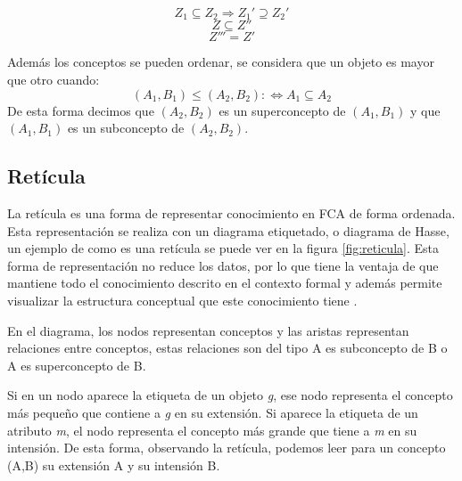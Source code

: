 \begin{equation}
Z_{1} \subseteq Z_{2} \Longrightarrow Z_{1}' \supseteq Z_{2}'
\end{equation}
\begin{equation}
Z \subseteq Z''
\end{equation}
\begin{equation}
Z''' = Z'
\end{equation}

Además los conceptos se pueden ordenar, se considera que un objeto es mayor que otro cuando:
\begin{equation}
(A_{1},B_{1}) \leq (A_{2},B_{2}) : \Leftrightarrow A_{1} \subseteq A_{2}
\end{equation}
De esta forma decimos que $(A_{2},B_{2})$ es un superconcepto de $(A_{1},B_{1})$ y que $(A_{1},B_{1})$ es un subconcepto de $(A_{2},B_{2})$.


\subsection{Retícula}

La retícula es una forma de representar conocimiento en FCA de forma ordenada. Esta representación se realiza con un diagrama etiquetado, o diagrama de Hasse, un ejemplo de como es una retícula se puede ver en la figura \ref{fig:reticula}. Esta forma de representación no reduce los datos, por lo que tiene la ventaja de que mantiene todo el conocimiento descrito en el contexto formal y además permite visualizar la estructura conceptual que este conocimiento tiene
\cite{A5}.

En el diagrama, los nodos representan conceptos y las aristas representan relaciones entre conceptos, estas relaciones son del tipo A es subconcepto de B o A es superconcepto de B.

Si en un nodo aparece la etiqueta de un objeto \textit{g}, ese nodo representa el concepto más pequeño que contiene a \textit{g} en su extensión. Si aparece la etiqueta de un atributo \textit{m}, el nodo representa el concepto más grande que tiene a \textit{m} en su intensión. De esta forma, observando la retícula, podemos leer para un concepto (A,B) su extensión A y su intensión B.


%
